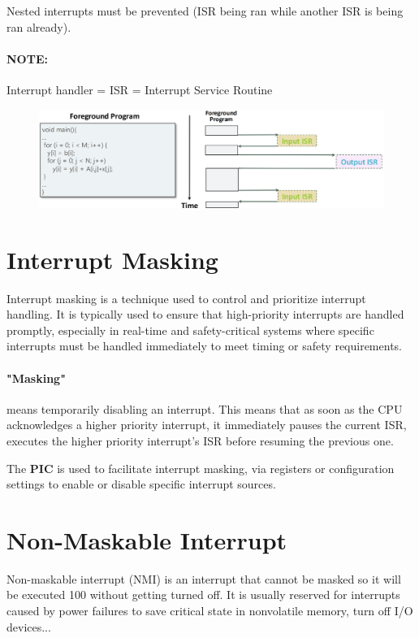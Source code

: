 Nested interrupts must be prevented (ISR being ran while another ISR is being ran already).

\paragraph{NOTE: } Interrupt handler = ISR = Interrupt Service Routine


\begin{figure}[H]
    \centering
    \includegraphics[width=0.9\linewidth]{img/image42.png}
\end{figure}


\section{Interrupt Masking}

Interrupt masking is a technique used to control and prioritize interrupt handling. It is typically used
to ensure that high-priority interrupts are handled promptly, especially in real-time and safety-critical
systems where specific interrupts must be handled immediately to meet timing or safety requirements.

\paragraph{"Masking"} means temporarily disabling an interrupt. This means that as soon as the CPU
acknowledges a higher priority interrupt, it immediately pauses the current ISR, executes the higher
priority interrupt's ISR before resuming the previous one.

The \textbf{PIC} is used to facilitate interrupt masking, via registers or configuration settings to enable or disable
specific interrupt sources.


\section{Non-Maskable Interrupt}

Non-maskable interrupt (NMI) is an interrupt that cannot be masked so it will be executed 100%
without getting turned off. It is usually reserved for interrupts caused by power failures to save critical
state in nonvolatile memory, turn off I/O devices...

